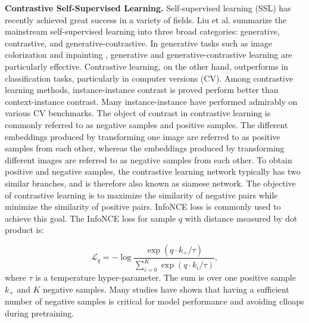 \documentclass[conference]{IEEEtran}
\begin{document}
\textbf{Contrastive Self-Supervised Learning.}
Self-supervised learning (SSL) has recently achieved great success in a variety of fields.
Liu et al.\cite{review_generativeOrConstrasive} summarize the mainstream self-supervised learning into three broad categories: generative, contrastive, and generative-contrastive. 
In generative tasks such as image colorization \cite{colorization} and inpainting \cite{inpainting}, generative and generative-contrastive learning are particularly effective.
Contrastive learning, on the other hand, outperforms in classification tasks, particularly in computer versions (CV). Among contrastive learning methods, instance-instance contrast is proved perform better than context-instance contrast\cite{review_generativeOrConstrasive}. Many instance-instance\cite{he2019moco,SimCLR,moco_v2_chen2020improved,simclr_v2_chen2020big,BarlowTwins,BYOL,SwAV} have performed admirably on various CV benchmarks.
The object of contrast in contrastive learning is commonly referred to as negative samples and positive samples.
The different embeddings produced by transforming one image are referred to as positive samples from each other, whereas the embeddings produced by transforming different images are referred to as negative samples from each other. 
To obtain positive and negative samples, the contrastive learning network typically has two similar branches, and is therefore also known as siamese network\cite{simsiam}. 
The objective of contrastive learning is to maximize the similarity of negative pairs while minimize the similarity of positive pairs. 
InfoNCE\cite{CPC_Oord2018RepresentationLW} loss is commonly used to achieve this goal.
The InfoNCE loss for sample $q$ with distance measured by dot product is:

\begin{equation}
\label{equ:InfoNCE}
\mathcal{L}_{q}=-\log \frac{\exp \left(q \cdot k_{+} / \tau\right)}{\sum_{i=0}^{K} \exp \left(q \cdot k_{i} / \tau\right)},
\end{equation}
where $\tau$ is a temperature hyper-parameter. The sum is over one positive sample $k_+$ and $K$ negative samples. Many studies \cite{SimCLR,he2019moco,BarlowTwins} have shown that having a sufficient number of negative samples is critical for model performance and avoiding clloaps during pretraining.
\end{document}
